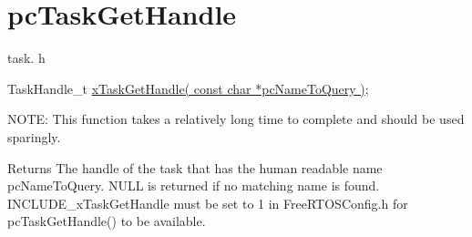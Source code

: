 \hypertarget{group__pc_task_get_handle}{}\section{pc\+Task\+Get\+Handle}
\label{group__pc_task_get_handle}
task. h 
\begin{DoxyPre}TaskHandle\_t \hyperlink{externals_2freertos_2include_2task_8h_a45b3b1cd0227269609499beeeb8c5c26}{xTaskGetHandle( const char *pcNameToQuery )};\end{DoxyPre}


N\+O\+TE\+: This function takes a relatively long time to complete and should be used sparingly.

\begin{DoxyReturn}{Returns}
The handle of the task that has the human readable name pc\+Name\+To\+Query. N\+U\+LL is returned if no matching name is found. I\+N\+C\+L\+U\+D\+E\+\_\+x\+Task\+Get\+Handle must be set to 1 in Free\+R\+T\+O\+S\+Config.\+h for pc\+Task\+Get\+Handle() to be available. 
\end{DoxyReturn}
